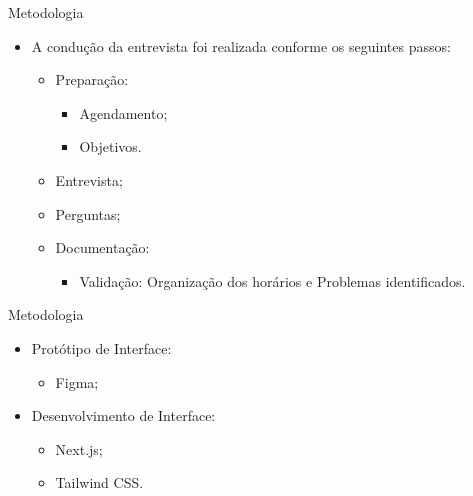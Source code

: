 \begin{frame}{Metodologia}
    \begin{itemize}
        \item A condução da entrevista foi realizada conforme os seguintes passos: \vspace{0.25cm}
              \begin{itemize}
                  \item Preparação: \vspace{0.25cm}
                        \begin{itemize}
                            \item Agendamento; \vspace{0.25cm}
                            \item Objetivos. \vspace{0.25cm}
                        \end{itemize}
                  \item Entrevista; \vspace{0.25cm}
                  \item Perguntas; \vspace{0.25cm}
                  \item Documentação: \vspace{0.25cm}
                        \begin{itemize}
                            \item Validação: Organização dos horários e Problemas identificados. \vspace{0.25cm}
                        \end{itemize}
              \end{itemize}
    \end{itemize}
\end{frame}

\begin{frame}{Metodologia}
    \begin{itemize}
        \item Protótipo de Interface: \vspace{0.5cm}
              \begin{itemize}
                  \item Figma; \vspace{0.5cm}
              \end{itemize}
        \item Desenvolvimento de Interface: \vspace{0.5cm}
              \begin{itemize}
                  \item Next.js; \vspace{0.5cm}
                  \item Tailwind CSS. \vspace{0.5cm}
              \end{itemize}
    \end{itemize}
\end{frame}

